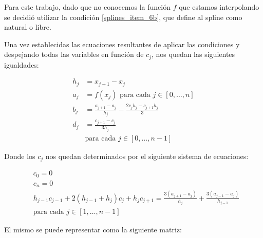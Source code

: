 Para este trabajo, dado que no conocemos la función $f$ que estamos
interpolando se decidió utilizar la condición \ref{splines_item_6b}, que define
al spline como natural o libre.

Una vez establecidas las ecuaciones resultantes de aplicar las condiciones y
despejando todas las variables en función de $c_j$\cite{Burden}, nos quedan las siguientes igualdades:

\begin{align*}
	h_j &= x_{j+1} - x_j \\
	a_j &= f(x_j) \text{ para cada } j \in [0, \dots, n] \\
	b_j &= \frac{a_{j+1}-a_j}{h_j} - \frac{2c_jh_j - c_{j+1}h_j}{3} \\
	d_j &= \frac{c_{j+1} - c_j}{3h_j} \\
		&\text{para cada } j \in [0, \dots, n - 1]
\end{align*}

Donde los $c_j$ nos quedan determinados por el siguiente sistema de ecuaciones:

\begin{align*}
	&c_0 = 0 \\
	&c_n = 0 \\
	&h_{j-1}c_{j-1} + 2(h_{j-1} + h_j)c_j + h_jc_{j+1} = \frac{3(a_{j+1} - a_j)}{h_j} + \frac{3(a_{j-1} - a_j)}{h_{j-1}} \\
		&\text{para cada } j \in [1, \dots, n - 1]
\end{align*}

El mismo se puede representar como la siguiente matriz:

\setlength{\arraycolsep}{2pt}

